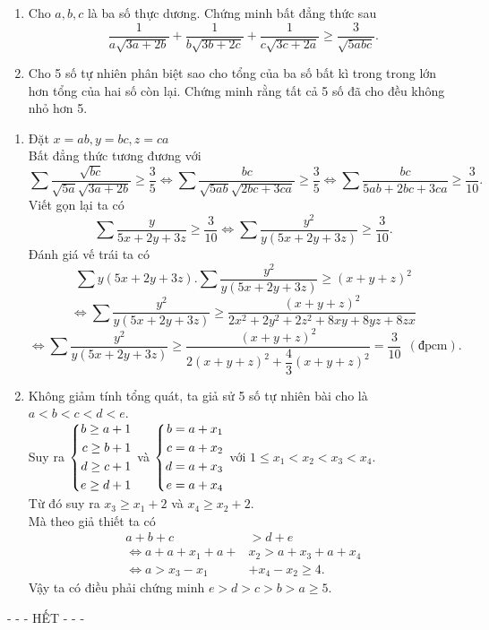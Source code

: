 \begin{ex}%
\hfill
	\begin{enumerate}
	\item Cho $a, b, c$ là ba số thực dương. Chứng minh bất đẳng thức sau
	$$\dfrac{1}{a\sqrt{3a+2b}}+\dfrac{1}{b\sqrt{3b+2c}}+\dfrac{1}{c\sqrt{3c+2a}}\ge \dfrac{3}{\sqrt{5abc}}.$$
	\item Cho 5 số tự nhiên phân biệt sao cho tổng của ba số bất kì trong trong lớn hơn tổng của hai số còn lại. Chứng minh rằng tất cả 5 số đã cho đều không nhỏ hơn 5.
	\end{enumerate}
\loigiai
    {
    \begin{enumerate}
    \item Đặt $x=ab, y=bc, z=ca$\\
    Bất đẳng thức tương đương với
    $$\sum \dfrac{\sqrt{bc}}{\sqrt{5a}\sqrt{3a+2b}}\ge \dfrac{3}{5}
    \Leftrightarrow \sum\dfrac{bc}{\sqrt{5ab}\sqrt{2bc+3ca}}\ge \dfrac{3}{5}
    \Leftrightarrow \sum\dfrac{bc}{5ab+2bc+3ca}\ge\dfrac{3}{10}.$$
	Viết gọn lại ta có    
    $$\sum\dfrac{y}{5x+2y+3z}\ge \dfrac{3}{10}\Leftrightarrow\sum\dfrac{y^2}{y(5x+2y+3z)}\ge \dfrac{3}{10}.$$
    Đánh giá vế trái ta có
    $$\sum y(5x+2y+3z).\sum\dfrac{y^2}{y(5x+2y+3z)}\ge (x+y+z)^2$$
    $$\Leftrightarrow \sum\dfrac{y^2}{y(5x+2y+3z)}\ge\dfrac{(x+y+z)^2}{2x^2+2y^2+2z^2+8xy+8yz+8zx}$$
    $$\Leftrightarrow \sum\dfrac{y^2}{y(5x+2y+3z)}\ge\dfrac{(x+y+z)^2}{2(x+y+z)^2+\dfrac{4}{3}(x+y+z)^2}=\dfrac{3}{10}\ \ (\mbox{đpcm}).$$
    \item Không giảm tính tổng quát, ta giả sử 5 số tự nhiên bài cho là $a<b<c<d<e$.\\
    Suy ra $\left\{\begin{aligned}b\ge a+1\\ c\ge b+1\\ d\ge c+1\\ e\ge d+1\end{aligned}\right.$ và $\left\{\begin{aligned}b=a+x_1\\ c=a+x_2\\ d=a+x_3\\ e=a+x_4\end{aligned}\right.$ với $1\le x_1<x_2<x_3<x_4$.\\ 
    Từ đó suy ra $x_3\ge x_1+2$ và $x_4\ge x_2+2$.\\
    Mà theo giả thiết ta có
    \begin{align*}
    a+b+c&>d+e\\
    \Leftrightarrow a+a+x_1+a+&x_2>a+x_3+a+x_4\\
    \Leftrightarrow a>x_3-x_1&+x_4-x_2\ge 4.
    \end{align*}
    Vậy ta có điều phải chứng minh $e>d>c>b>a\ge 5$.
    \end{enumerate}
    }
\end{ex}
\centerline{- - - HẾT - - -}
